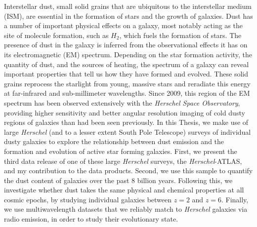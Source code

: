 Interstellar dust, small solid grains that are ubiquitous to the interstellar medium (ISM), are essential in the formation of stars and the growth of galaxies. Dust has a number of important physical effects on a galaxy, most notably acting as the site of molecule formation, such as $H_2$, which fuels the formation of stars. The presence of dust in the galaxy is inferred from the observational effects it has on its electromagnetic (EM) spectrum. Depending on the star formation activity, the quantity of dust, and the sources of heating, the spectrum of a galaxy can reveal important properties that tell us how they have formed and evolved. These solid grains reprocess the starlight from young, massive stars and reradiate this energy at far-infrared and sub-millimeter wavelengths. Since 2009, this region of the EM spectrum has been observed extensively with the \textit{Herschel Space Observatory}, providing higher sensitivity and better angular resolution imaging of cold dusty regions of galaxies than had been seen previously. In this Thesis, we make use of large \textit{Herschel} (and to a lesser extent South Pole Telescope) surveys of individual dusty galaxies to explore the relationship between dust emission and the formation and evolution of active star forming galaxies. First, we present the third data release of one of these large \textit{Herschel} surveys, the \textit{Herschel}-ATLAS, and my contribution to the data products. Second, we use this sample to quantify the dust content of galaxies over the past $8$ billion years. Following this, we investigate whether dust takes the same physical and chemical properties at all cosmic epochs, by studying individual galaxies between $z = 2$ and $z = 6$. Finally, we use multiwavelength datasets that we reliably match to \textit{Herschel} galaxies via radio emission, in order to study their evolutionary state.